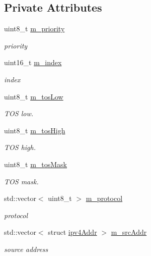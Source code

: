 \subsection*{Private Attributes}
\begin{DoxyCompactItemize}
\item 
uint8\+\_\+t \hyperlink{classns3_1_1IpcsClassifierRecord_ac92730633e3a9b2143ddc48140780be8}{m\+\_\+priority}
\begin{DoxyCompactList}\small\item\em priority \end{DoxyCompactList}\item 
uint16\+\_\+t \hyperlink{classns3_1_1IpcsClassifierRecord_a62ea826b5a15e0db1dfeec2f85c870cf}{m\+\_\+index}
\begin{DoxyCompactList}\small\item\em index \end{DoxyCompactList}\item 
uint8\+\_\+t \hyperlink{classns3_1_1IpcsClassifierRecord_a2bf94f3ee75c2ea466fc1ba40d3da488}{m\+\_\+tos\+Low}
\begin{DoxyCompactList}\small\item\em T\+OS low. \end{DoxyCompactList}\item 
uint8\+\_\+t \hyperlink{classns3_1_1IpcsClassifierRecord_afa4c97d018dd7bc728631f7cecc24120}{m\+\_\+tos\+High}
\begin{DoxyCompactList}\small\item\em T\+OS high. \end{DoxyCompactList}\item 
uint8\+\_\+t \hyperlink{classns3_1_1IpcsClassifierRecord_a51cec1405f4bac281234a0e4b2c9a683}{m\+\_\+tos\+Mask}
\begin{DoxyCompactList}\small\item\em T\+OS mask. \end{DoxyCompactList}\item 
std\+::vector$<$ uint8\+\_\+t $>$ \hyperlink{classns3_1_1IpcsClassifierRecord_adfc6f43d00633b034bc8940a7ae9126c}{m\+\_\+protocol}
\begin{DoxyCompactList}\small\item\em protocol \end{DoxyCompactList}\item 
std\+::vector$<$ struct \hyperlink{structns3_1_1IpcsClassifierRecord_1_1ipv4Addr}{ipv4\+Addr} $>$ \hyperlink{classns3_1_1IpcsClassifierRecord_a9135b69bdf633be39cc1f848ef2bcaf3}{m\+\_\+src\+Addr}
\begin{DoxyCompactList}\small\item\em source address \end{DoxyCompactList}\item 

\end{DoxyCompactItemize}
